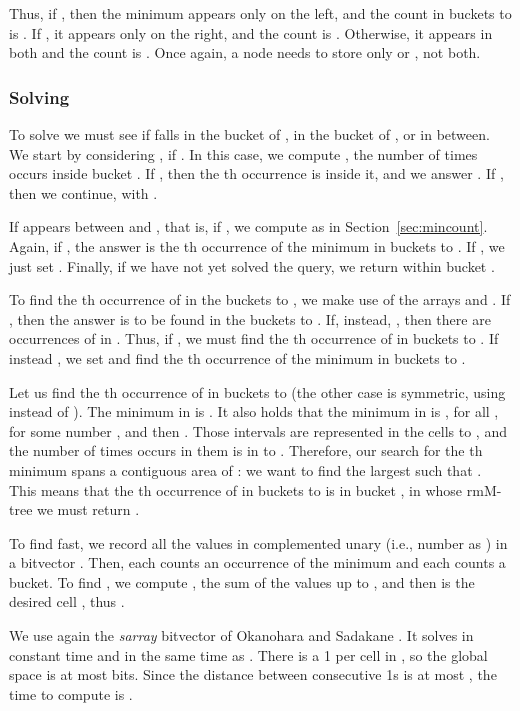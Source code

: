 \documentclass[11pt]{article}
\newcommand{\0}{\mathit{0}}
\newcommand{\1}{\mathit{1}}
\begin{document}
Thus, if , then the minimum appears only on the
left, and the count in buckets  to  is . If 
, it appears only on the right, and the count is
. Otherwise, it appears in both and the count is
.  Once again, a node needs to store only
 or , not both.

\subsubsection{Solving }

To solve  we must see if  falls in the bucket of ,
in the bucket of , or in between. We start by considering , if
. In this case, we compute ,
the number of times  occurs inside bucket . If , then the
th occurrence is inside it, and we answer
. If , then we continue, with
.

If  appears between  and , that is, if , we compute
 as in Section~\ref{sec:mincount}. Again,
if , the answer is the th occurrence of the
minimum in buckets  to . If , we just set .
Finally, if we have not yet solved the query, we return
 within bucket .

To find the th occurrence of  in the buckets  to , we make use
of the arrays  and . If , then the answer is to be
found in the buckets  to . If, instead, , then there
are  occurrences of  in . Thus, if ,
we must find the th occurrence of  in buckets  to . If instead
, we set  and find the th
occurrence of the minimum in buckets  to .

Let us find the th occurrence of  in buckets  to  (the other case
is symmetric, using  instead of ). The minimum in  is . It
also holds that the minimum in  is , for all ,
for some number , and then . Those intervals are
represented in the cells  to , and the number of times
 occurs in them is in  to . Therefore, our 
search for the th minimum spans a contiguous area of : we want
to find the largest  such that . This means
that the th occurrence of  in buckets  to  is in bucket
, in whose rmM-tree we must return .

To find  fast, we record all the values  in 
complemented unary (i.e., number  as ) in a bitvector . Then,
each  counts an occurrence of the minimum and each  counts a bucket. 
To find , we compute
, the sum of the values up to , and then
 is the desired cell , thus 
.

We use again the \emph{sarray} bitvector of Okanohara and Sadakane \cite{OS07}.
It solves  in constant time and  in the same time as
.  There is a 1 per cell in , so the global space is at most  bits.  Since the distance between
consecutive 1s is at most , the time to compute  is
.
\end{document}
